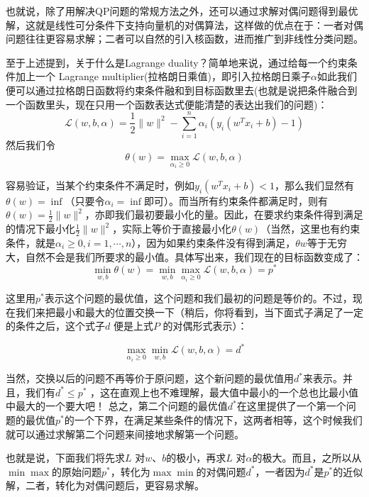 \documentclass[a4paper,12pt]{article}
\begin{document}
也就说，除了用解决QP问题的常规方法之外，还可以通过求解对偶问题得到最优解，这就是线性可分条件下支持向量机的对偶算法，这样做的优点在于：一者对偶问题往往更容易求解；二者可以自然的引入核函数，进而推广到非线性分类问题。

至于上述提到，关于什么是Lagrange duality？简单地来说，通过给每一个约束条件加上一个 Lagrange multiplier(拉格朗日乘值)，即引入拉格朗日乘子$\alpha$如此我们便可以通过拉格朗日函数将约束条件融和到目标函数里去(也就是说把条件融合到一个函数里头，现在只用一个函数表达式便能清楚的表达出我们的问题)：
\begin{equation}
  \mathcal{L}(w,b,\alpha)=\frac{1}{2}\|w\|^2-\sum_{i=1}^n\alpha_i\left(y_i(w^Tx_i+b)-1\right)
\end{equation}
然后我们令
\begin{equation}
  \theta(w)=\max_{\alpha_i\geq0}\mathcal{L}(w,b,\alpha)
\end{equation}

容易验证，当某个约束条件不满足时，例如$y_i(w^Tx_i+b)<1$，那么我们显然有$\theta(w)=\inf$（只要令$\alpha_i=\inf$即可）。而当所有约束条件都满足时，则有$\theta(w)=\frac{1}{2}\|w\|^2$，亦即我们最初要最小化的量。因此，在要求约束条件得到满足的情况下最小化$\frac{1}{2}\|w\|^2$，实际上等价于直接最小化$\theta(w)$（当然，这里也有约束条件，就是$\alpha_i\geq0,i=1,\cdots,n$），因为如果约束条件没有得到满足，$\theta{w}$等于无穷大，自然不会是我们所要求的最小值。具体写出来，我们现在的目标函数变成了：
\begin{equation}
  \min_{w,b}\theta(w)=\min_{w,b}\max_{\alpha_i\geq0}\mathcal{L}(w,b,\alpha)=p^*
\end{equation}

 这里用$p^*$表示这个问题的最优值，这个问题和我们最初的问题是等价的。不过，现在我们来把最小和最大的位置交换一下（稍后，你将看到，当下面式子满足了一定的条件之后，这个式子$d$ 便是上式$P$ 的对偶形式表示）：
 
\begin{equation}
  \max_{\alpha_i\geq0}\min_{w,b}\mathcal{L}(w,b,\alpha)=d^*
\end{equation}

当然，交换以后的问题不再等价于原问题，这个新问题的最优值用$d^*$来表示。并且，我们有$d^*\leq p^*$ ，这在直观上也不难理解，最大值中最小的一个总也比最小值中最大的一个要大吧！  总之，第二个问题的最优值$d^*$在这里提供了一个第一个问题的最优值$p^*$的一个下界，在满足某些条件的情况下，这两者相等，这个时候我们就可以通过求解第二个问题来间接地求解第一个问题。

也就是说，下面我们将先求$L$ 对$w$、$b$的极小，再求$L$ 对$\alpha$的极大。而且，之所以从$\min\max$的原始问题$p^*$，转化为$\max\min$的对偶问题$d^*$，一者因为$d^*$是$p^*$的近似解，二者，转化为对偶问题后，更容易求解。
\end{document}
